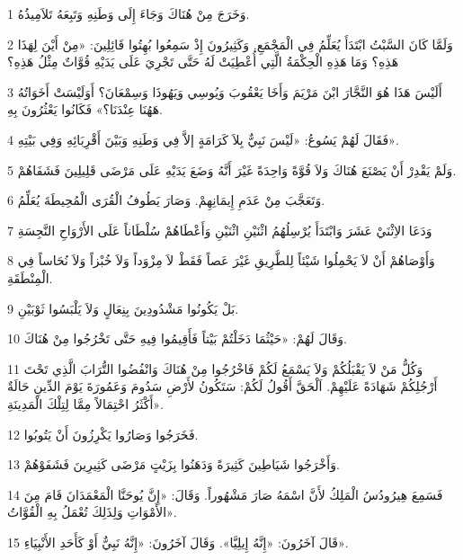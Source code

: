\par 1 وَخَرَجَ مِنْ هُنَاكَ وَجَاءَ إِلَى وَطَنِهِ وَتَبِعَهُ تَلاَمِيذُهُ.
\par 2 وَلَمَّا كَانَ السَّبْتُ ابْتَدَأَ يُعَلِّمُ فِي الْمَجْمَعِ. وَكَثِيرُونَ إِذْ سَمِعُوا بُهِتُوا قَائِلِينَ: «مِنْ أَيْنَ لِهَذَا هَذِهِ؟ وَمَا هَذِهِ الْحِكْمَةُ الَّتِي أُعْطِيَتْ لَهُ حَتَّى تَجْرِيَ عَلَى يَدَيْهِ قُوَّاتٌ مِثْلُ هَذِهِ؟
\par 3 أَلَيْسَ هَذَا هُوَ النَّجَّارَ ابْنَ مَرْيَمَ وَأَخَا يَعْقُوبَ وَيُوسِي وَيَهُوذَا وَسِمْعَانَ؟ أَوَلَيْسَتْ أَخَوَاتُهُ هَهُنَا عِنْدَنَا؟» فَكَانُوا يَعْثُرُونَ بِهِ.
\par 4 فَقَالَ لَهُمْ يَسُوعُ: «لَيْسَ نَبِيٌّ بِلاَ كَرَامَةٍ إلاَّ فِي وَطَنِهِ وَبَيْنَ أَقْرِبَائِهِ وَفِي بَيْتِهِ».
\par 5 وَلَمْ يَقْدِرْ أَنْ يَصْنَعَ هُنَاكَ وَلاَ قُوَّةً وَاحِدَةً غَيْرَ أَنَّهُ وَضَعَ يَدَيْهِ عَلَى مَرْضَى قَلِيلِينَ فَشَفَاهُمْ.
\par 6 وَتَعَجَّبَ مِنْ عَدَمِ إِيمَانِهِمْ. وَصَارَ يَطُوفُ الْقُرَى الْمُحِيطَةَ يُعَلِّمُ.
\par 7 وَدَعَا الاِثْنَيْ عَشَرَ وَابْتَدَأَ يُرْسِلُهُمُ اثْنَيْنِ اثْنَيْنِ وَأَعْطَاهُمْ سُلْطَاناً عَلَى الأَرْوَاحِ النَّجِسَةِ
\par 8 وَأَوْصَاهُمْ أَنْ لاَ يَحْمِلُوا شَيْئاً لِلطَّرِيقِ غَيْرَ عَصاً فَقَطْ لاَ مِزْوَداً وَلاَ خُبْزاً وَلاَ نُحَاساً فِي الْمِنْطَقَةِ.
\par 9 بَلْ يَكُونُوا مَشْدُودِينَ بِنِعَالٍ وَلاَ يَلْبَسُوا ثَوْبَيْنِ.
\par 10 وَقَالَ لَهُمْ: «حَيْثُمَا دَخَلْتُمْ بَيْتاً فَأَقِيمُوا فِيهِ حَتَّى تَخْرُجُوا مِنْ هُنَاكَ.
\par 11 وَكُلُّ مَنْ لاَ يَقْبَلُكُمْ وَلاَ يَسْمَعُ لَكُمْ فَاخْرُجُوا مِنْ هُنَاكَ وَانْفُضُوا التُّرَابَ الَّذِي تَحْتَ أَرْجُلِكُمْ شَهَادَةً عَلَيْهِمْ. اَلْحَقَّ أَقُولُ لَكُمْ: سَتَكُونُ لأَرْضِ سَدُومَ وَعَمُورَةَ يَوْمَ الدِّينِ حَالَةٌ أَكْثَرُ احْتِمَالاً مِمَّا لِتِلْكَ الْمَدِينَةِ».
\par 12 فَخَرَجُوا وَصَارُوا يَكْرِزُونَ أَنْ يَتُوبُوا.
\par 13 وَأَخْرَجُوا شَيَاطِينَ كَثِيرَةً وَدَهَنُوا بِزَيْتٍ مَرْضَى كَثِيرِينَ فَشَفَوْهُمْ.
\par 14 فَسَمِعَ هِيرُودُسُ الْمَلِكُ لأَنَّ اسْمَهُ صَارَ مَشْهُوراً. وَقَالَ: «إِنَّ يُوحَنَّا الْمَعْمَدَانَ قَامَ مِنَ الأَمْوَاتِ وَلِذَلِكَ تُعْمَلُ بِهِ الْقُوَّاتُ».
\par 15 قَالَ آخَرُونَ: «إِنَّهُ إِيلِيَّا». وَقَالَ آخَرُونَ: «إِنَّهُ نَبِيٌّ أَوْ كَأَحَدِ الأَنْبِيَاءِ».
